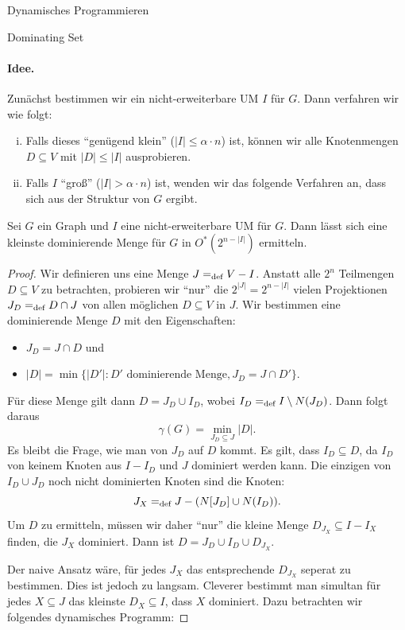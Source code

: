 \begin{chapter}{Dynamisches Programmieren}
\begin{section}{Dominating Set}
  \paragraph{Idee.} Zunächst bestimmen wir ein nicht-erweiterbare UM \(I\) für $G$. Dann verfahren wir wie folgt:
  \begin{enumerate}[i)]
   \item Falls dieses ``genügend klein'' ($|I| \leq\alpha \cdot n$) ist, können wir alle Knotenmengen \(D \subseteq V\) mit \(|D| \leq |I|\) ausprobieren. 
   \item Falls \(I\) ``groß'' ($|I| > \alpha \cdot n$) ist, wenden wir das folgende Verfahren an, dass sich aus der Struktur von $G$ ergibt.
  \end{enumerate}

  \begin{lemma}
  \label{domSet}
    Sei \(G\) ein Graph und \(I\) eine nicht-erweiterbare UM für $G$. Dann lässt sich eine kleinste dominierende Menge für $G$ in \(O^*(2^{n-|I|})\) ermitteln.
  \end{lemma}


  \begin{proof}
    Wir definieren uns eine Menge $J =_\text{def} V -I$. Anstatt alle $2^n$ Teilmengen $D\subseteq V$ zu betrachten, probieren wir ``nur'' die $2^{|J|} = 2^{n-|I|}$ vielen Projektionen \(J_D =_\text{def} D \cap J\) von allen möglichen $D\subseteq V$ in $J$. Wir bestimmen eine dominierende Menge $D$ mit den Eigenschaften: 
    \begin{itemize}
     \item $J_D = J \cap D$ und 
     \item $|D| = \min \{|D'|: D' \text{ dominierende Menge}, J_D = J \cap D'\}$.
    \end{itemize}
    Für diese Menge gilt dann $D = J_D \cup I_D$, wobei \(I_D =_\text{def} I \setminus N(J_D)\). Dann folgt daraus 
    \[\gamma(G) = \min_{J_D \subseteq J} |D|\text{.}\]
    Es bleibt die Frage, wie man von $J_D$ auf $D$ kommt. Es gilt, dass $I_D \subseteq D$, da $I_D$ von keinem Knoten aus $I - I_D$ und $J$ dominiert werden kann. Die einzigen von $I_D \cup J_D$ noch nicht dominierten Knoten sind die Knoten:
    \[J_X =_\text{def} J - (N[J_D]\cup N(I_D))\text{.}\]
    Um $D$ zu ermitteln, müssen wir daher ``nur'' die kleine Menge $D_{J_X} \subseteq I - I_X$ finden, die $J_X$ dominiert. Dann ist $D= J_D \cup I_D \cup D_{J_X}$.

    Der naive Ansatz wäre, für jedes $J_X$ das entsprechende $D_{J_X}$ seperat zu bestimmen. Dies ist jedoch zu langsam. Cleverer bestimmt man simultan für jedes $X \subseteq J$ das kleinste $D_X \subseteq I$, dass $X$ dominiert. Dazu betrachten wir folgendes dynamisches Programm:
    

\end{proof}
\end{section}
\end{chapter}
